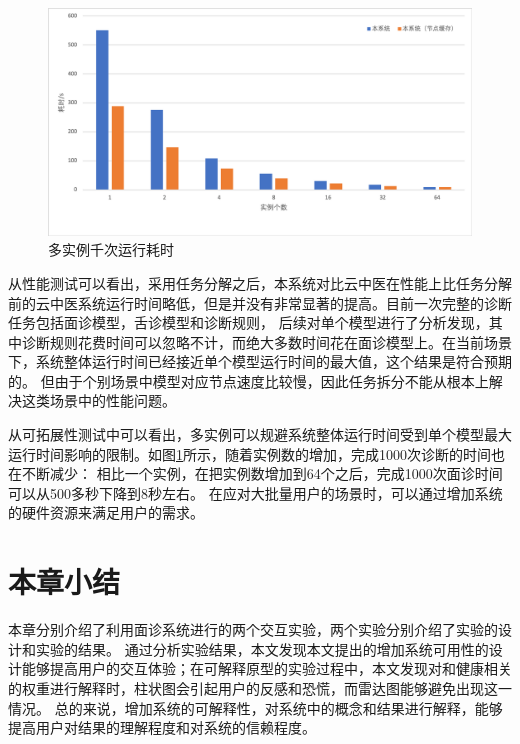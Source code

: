 \begin{figure}[h]
    \centering
    \includegraphics[width=12cm]{images/minstances.png}
    \caption{多实例千次运行耗时}
    \label{fig:minstantces}
\end{figure}

从性能测试可以看出，采用任务分解之后，本系统对比云中医在性能上比任务分解前的云中医系统运行时间略低，但是并没有非常显著的提高。目前一次完整的诊断任务包括面诊模型，舌诊模型和诊断规则，
后续对单个模型进行了分析发现，其中诊断规则花费时间可以忽略不计，而绝大多数时间花在面诊模型上。在当前场景下，系统整体运行时间已经接近单个模型运行时间的最大值，这个结果是符合预期的。
但由于个别场景中模型对应节点速度比较慢，因此任务拆分不能从根本上解决这类场景中的性能问题。

从可拓展性测试中可以看出，多实例可以规避系统整体运行时间受到单个模型最大运行时间影响的限制。如图\ref{fig:minstantces}所示，随着实例数的增加，完成1000次诊断的时间也在不断减少：
相比一个实例，在把实例数增加到64个之后，完成1000次面诊时间可以从500多秒下降到8秒左右。
在应对大批量用户的场景时，可以通过增加系统的硬件资源来满足用户的需求。




\section{本章小结}

本章分别介绍了利用面诊系统进行的两个交互实验，两个实验分别介绍了实验的设计和实验的结果。
通过分析实验结果，本文发现本文提出的增加系统可用性的设计能够提高用户的交互体验；在可解释原型的实验过程中，本文发现对和健康相关的权重进行解释时，柱状图会引起用户的反感和恐慌，而雷达图能够避免出现这一情况。
总的来说，增加系统的可解释性，对系统中的概念和结果进行解释，能够提高用户对结果的理解程度和对系统的信赖程度。


